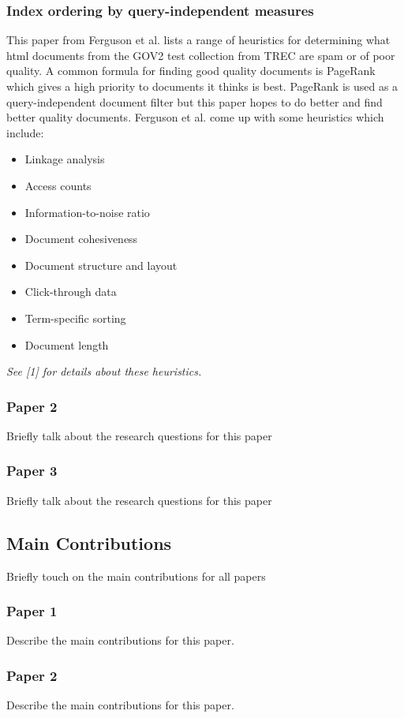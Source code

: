 \documentclass{acm_proc_article-sp}
\begin{document}
\subsubsection{Index ordering by query-independent measures}
This paper from Ferguson et al. lists a range of heuristics for determining what html documents from the GOV2 test collection from TREC are spam or of poor quality. A common formula for finding good quality documents is PageRank which gives a high priority to documents it thinks is best. PageRank is used as a query-independent document filter but this paper hopes to do better and find better quality documents. Ferguson et al. come up with some heuristics which include:
\begin{itemize}
\item Linkage analysis
\item Access counts
\item Information-to-noise ratio
\item Document cohesiveness
\item Document structure and layout
\item Click-through data
\item Term-specific sorting
\item Document length
\end{itemize}
\emph{See [1] for details about these heuristics.}

\subsubsection{Paper 2}
Briefly talk about the research questions for this paper

\subsubsection{Paper 3}
Briefly talk about the research questions for this paper

\subsection{Main Contributions}
Briefly touch on the main contributions for all papers
\subsubsection{Paper 1}
Describe the main contributions for this paper.

\subsubsection{Paper 2}
Describe the main contributions for this paper.
\end{document}
